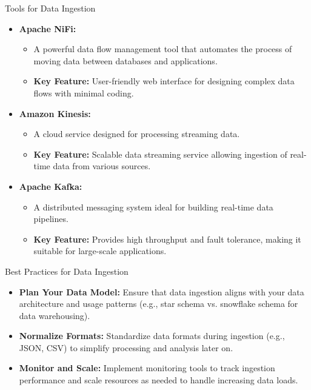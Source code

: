 \documentclass[aspectratio=169]{beamer}
\begin{document}
\begin{frame}[fragile]{Tools for Data Ingestion}
  \begin{itemize}
    \item \textbf{Apache NiFi:}
      \begin{itemize}
        \item A powerful data flow management tool that automates the process of moving data between databases and applications.
        \item \textbf{Key Feature:} User-friendly web interface for designing complex data flows with minimal coding.
      \end{itemize}
      
    \item \textbf{Amazon Kinesis:}
      \begin{itemize}
        \item A cloud service designed for processing streaming data.
        \item \textbf{Key Feature:} Scalable data streaming service allowing ingestion of real-time data from various sources.
      \end{itemize}
      
    \item \textbf{Apache Kafka:}
      \begin{itemize}
        \item A distributed messaging system ideal for building real-time data pipelines.
        \item \textbf{Key Feature:} Provides high throughput and fault tolerance, making it suitable for large-scale applications.
      \end{itemize}
  \end{itemize}
\end{frame}

\begin{frame}[fragile]{Best Practices for Data Ingestion}
  \begin{itemize}
    \item \textbf{Plan Your Data Model:} Ensure that data ingestion aligns with your data architecture and usage patterns (e.g., star schema vs. snowflake schema for data warehousing).
    \item \textbf{Normalize Formats:} Standardize data formats during ingestion (e.g., JSON, CSV) to simplify processing and analysis later on.
    \item \textbf{Monitor and Scale:} Implement monitoring tools to track ingestion performance and scale resources as needed to handle increasing data loads.
  \end{itemize}
\end{frame}
\end{document}
